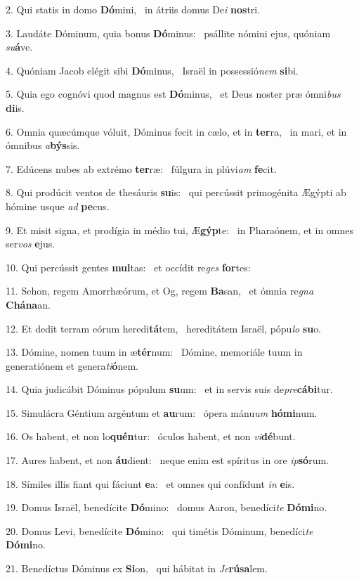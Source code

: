 2. Qui statis in domo \textbf{Dó}mini, \ast\  in átriis domus De\textit{i} \textbf{nos}tri.\

3. Laudáte Dóminum, quia bonus \textbf{Dó}minus: \ast\  psállite nómini ejus, quóniam \textit{su}\textbf{á}ve.\

4. Quóniam Jacob elégit sibi \textbf{Dó}minus, \ast\  Israël in possessió\textit{nem} \textbf{si}bi.\

5. Quia ego cognóvi quod magnus est \textbf{Dó}minus, \ast\  et Deus noster præ ómni\textit{bus} \textbf{di}is.\

6. Omnia quæcúmque vóluit, Dóminus fecit in cælo, et in \textbf{ter}ra, \ast\  in mari, et in ómnibus \textit{a}\textbf{býs}sis.\

7. Edúcens nubes ab extrémo \textbf{ter}ræ: \ast\  fúlgura in plúvi\textit{am} \textbf{fe}cit.\

8. Qui prodúcit ventos de thesáuris \textbf{su}is: \ast\  qui percússit primogénita Ægýpti ab hómine usque \textit{ad} \textbf{pe}cus.\

9. Et misit signa, et prodígia in médio tui, Æ\textbf{gýp}te: \ast\  in Pharaónem, et in omnes ser\textit{vos} \textbf{e}jus.\

10. Qui percússit gentes \textbf{mul}tas: \ast\  et occídit re\textit{ges} \textbf{for}tes:\

11. Sehon, regem Amorrhæórum, et Og, regem \textbf{Ba}san, \ast\  et ómnia re\textit{gna} \textbf{Chá}\textbf{na}an.\

12. Et dedit terram eórum heredi\textbf{tá}tem, \ast\  hereditátem Israël, pópu\textit{lo} \textbf{su}o.\

13. Dómine, nomen tuum in æ\textbf{tér}num: \ast\  Dómine, memoriále tuum in generatiónem et genera\textit{ti}\textbf{ó}nem.\

14. Quia judicábit Dóminus pópulum \textbf{su}um: \ast\  et in servis suis de\textit{pre}\textbf{cá}\textbf{bi}tur.\

15. Simulácra Géntium argéntum et \textbf{au}rum: \ast\  ópera mánu\textit{um} \textbf{hó}\textbf{mi}num.\

16. Os habent, et non lo\textbf{quén}tur: \ast\  óculos habent, et non \textit{vi}\textbf{dé}bunt.\

17. Aures habent, et non \textbf{áu}dient: \ast\  neque enim est spíritus in ore \textit{ip}\textbf{só}rum.\

18. Símiles illis fiant qui fáciunt \textbf{e}a: \ast\  et omnes qui confídunt \textit{in} \textbf{e}is.\

19. Domus Israël, benedícite \textbf{Dó}mino: \ast\  domus Aaron, benedíci\textit{te} \textbf{Dó}\textbf{mi}no.\

20. Domus Levi, benedícite \textbf{Dó}mino: \ast\  qui timétis Dóminum, benedíci\textit{te} \textbf{Dó}\textbf{mi}no.\

21. Benedíctus Dóminus ex \textbf{Si}on, \ast\  qui hábitat in \textit{Je}\textbf{rú}\textbf{sa}lem.\

